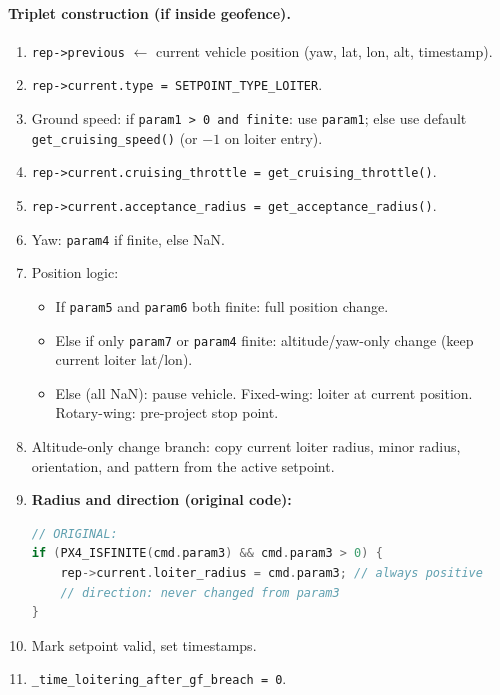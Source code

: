 \documentclass[12pt,a4paper]{article}
\begin{document}
\paragraph{Triplet construction (if inside geofence).}
\begin{enumerate}
  \item \texttt{rep->previous} $\leftarrow$ current vehicle position
        (yaw, lat, lon, alt, timestamp).
  \item \texttt{rep->current.type = SETPOINT\_TYPE\_LOITER}.
  \item Ground speed: if \texttt{param1 > 0 and finite}: use \texttt{param1};
        else use default \texttt{get\_cruising\_speed()} (or $-1$ on loiter entry).
  \item \texttt{rep->current.cruising\_throttle = get\_cruising\_throttle()}.
  \item \texttt{rep->current.acceptance\_radius = get\_acceptance\_radius()}.
  \item Yaw: \texttt{param4} if finite, else NaN.
  \item Position logic:
        \begin{itemize}
          \item If \texttt{param5} and \texttt{param6} both finite:
                full position change.
          \item Else if only \texttt{param7} or \texttt{param4} finite:
                altitude/yaw-only change (keep current loiter lat/lon).
          \item Else (all NaN): pause vehicle.
                Fixed-wing: loiter at current position.
                Rotary-wing: pre-project stop point.
        \end{itemize}
  \item Altitude-only change branch: copy current loiter radius, minor radius,
        orientation, and pattern from the active setpoint.
  \item \textbf{Radius and direction (original code):}
        \begin{lstlisting}[language=C++]
// ORIGINAL:
if (PX4_ISFINITE(cmd.param3) && cmd.param3 > 0) {
    rep->current.loiter_radius = cmd.param3; // always positive
    // direction: never changed from param3
}
        \end{lstlisting}
  \item Mark setpoint valid, set timestamps.
  \item \texttt{\_time\_loitering\_after\_gf\_breach = 0}.
\end{enumerate}
\end{document}
